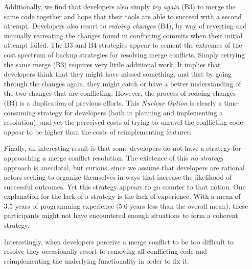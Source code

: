 Additionally, we find that developers also simply \textit{try again} (B3) to merge the same code together and hope that their tools are able to succeed with a second attempt.
Developers also resort to \textit{redoing changes} (B4), by way of reverting and manually recreating the changes found in conflicting commits when their initial attempt failed.
The B3 and B4 strategies appear to cement the extremes of the cost spectrum of backup strategies for resolving merge conflicts.
Simply retrying the same merge (B3) requires very little additional work.
It implies that developers think that they might have missed something, and that by going through the changes again, they might catch or have a better understanding of the two changes that are conflicting.
However, the process of redoing changes (B4) is a duplication of previous efforts. %
This \textit{Nuclear Option} is clearly a time-consuming strategy for developers (both in planning and implementing a resolution), and yet the perceived costs of trying to unravel the conflicting code appear to be higher than the costs of reimplementing features.

Finally, an interesting result is that some developers do not have a strategy for approaching a merge conflict resolution.
The existence of this \textit{no strategy} approach is anecdotal, but curious, since we assume that developers are rational actors seeking to organize themselves in ways that increase the likelihood of successful outcomes.
Yet this strategy appears to go counter to that notion.
One explanation for the lack of a strategy is the lack of experience.
With a mean of 3.5 years of programming experience (5.6 years less than the overall mean), these participants might not have encountered enough situations to form a coherent strategy.

Interestingly, when developers perceive a merge conflict to be too difficult to resolve they occasionally resort to removing all conflicting code and reimplementing the underlying functionality in order to fix it.